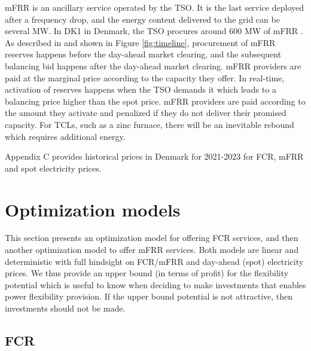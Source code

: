 \documentclass[conference]{IEEEtran}
\begin{document}
mFRR is an ancillary service operated by the TSO. It is the last service deployed after a frequency drop, and the energy content delivered to the grid can be several MW. In DK1 in Denmark, the TSO procures around 600 MW of mFRR \cite{energinet:scenario_report_2022}.
%
As described in \cite{gade2023load} and shown in Figure \ref{fig:timeline}, procurement of mFRR reserves happens before the day-ahead market clearing, and the subsequent balancing bid happens after the day-ahead market clearing. mFRR providers are paid at the marginal price according to the capacity they offer. In real-time, activation of reserves happens when the TSO demands it which leads to a balancing price higher than the spot price. mFRR providers are paid according to the amount they activate and penalized if they do not deliver their promised capacity. For TCLs, such as a zinc furnace, there will be an inevitable rebound which requires additional energy.

Appendix C provides historical prices in Denmark for 2021-2023 for FCR, mFRR and spot electricity prices.


\section{Optimization models}
This section presents an optimization model for offering FCR services, and then another optimization model to offer mFRR services.
Both models are linear and deterministic with full hindsight on FCR/mFRR and day-ahead (spot) electricity prices. We thus provide an upper bound (in terms of profit) for the flexibility potential which is useful to know when deciding to make investments that enables power flexibility provision. If the upper bound potential is not attractive, then investments should not be made.

\subsection{FCR}
\end{document}
